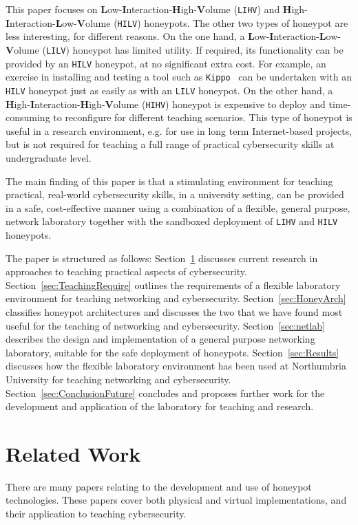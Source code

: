 \documentclass{ieeeaccess}
\begin{document}
This paper focuses on \textbf{L}ow-\textbf{I}nteraction-\textbf{H}igh-\textbf{V}olume
(\texttt{LIHV}) and \textbf{H}igh-\textbf{I}nteraction-\textbf{L}ow-\textbf{V}olume
(\texttt{HILV}) honeypots.  The other two types of honeypot are less
interesting, for different reasons. On the one hand, a
\textbf{L}ow-\textbf{I}nteraction-\textbf{L}ow-\textbf{V}olume (\texttt{LILV}) honeypot
has limited utility. If required, its functionality can be provided by an
\texttt{HILV} honeypot, at no significant extra cost. For example, an exercise
in installing and testing a tool such as \texttt{Kippo}~\cite{SH:15} can be
undertaken with an \texttt{HILV} honeypot just as easily as with an
\texttt{LILV} honeypot.  On the other hand, a
\textbf{H}igh-\textbf{I}nteraction-\textbf{H}igh-\textbf{V}olume (\texttt{HIHV})
honeypot is expensive to deploy and time-consuming to reconfigure for different
teaching scenarios. This type of honeypot is useful in a research environment,
e.g. for use in long term Internet-based projects, but is not required for
teaching a full range of practical cybersecurity skills at undergraduate level.

The main finding of this paper is that a stimulating environment for teaching
practical, real-world cybersecurity skills, in a university setting, can be
provided in a safe, cost-effective manner using a combination of a flexible,
general purpose, network laboratory together with the sandboxed deployment of
\texttt{LIHV} and \texttt{HILV} honeypots.

The paper is structured as follows: Section~\ref{sec:RelatedWork} discusses
current research in approaches to teaching practical aspects of cybersecurity.
Section~\ref{sec:TeachingRequire} outlines the requirements of a flexible
laboratory environment for teaching networking and cybersecurity.
Section~\ref{sec:HoneyArch} classifies honeypot architectures and discusses the
two that we have found most useful for the teaching of networking and
cybersecurity.  Section~\ref{sec:netlab} describes the design and
implementation of a general purpose networking laboratory, suitable
for the safe deployment of honeypots.  Section~\ref{sec:Results} discusses how
the flexible laboratory environment has been used at Northumbria University for
teaching networking and cybersecurity.  Section~\ref{sec:ConclusionFuture}
concludes and proposes further work for the development and application of the
laboratory for teaching and research.

\section{Related Work}\label{sec:RelatedWork}
There are many papers relating to the development and use of honeypot
technologies. These papers cover both physical and virtual implementations, and
their application to teaching cybersecurity. 
\end{document}
